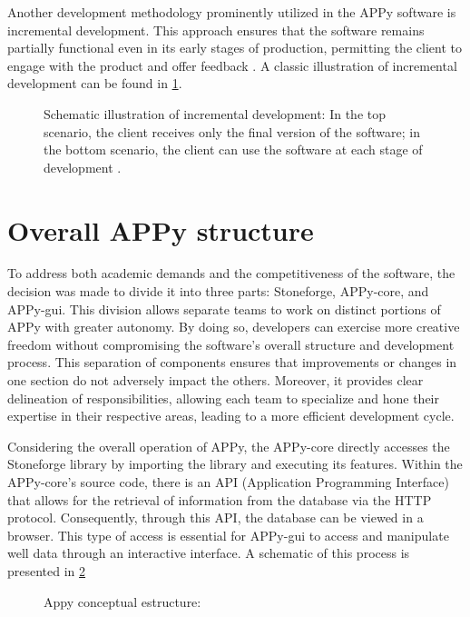 \documentclass[10pt,twocolumn,twoside]{article}
\begin{document}
Another development methodology prominently utilized in the APPy software is incremental development. This approach ensures that the software remains partially functional even in its early stages of production, permitting the client to engage with the product and offer feedback \citep{rolakuchta2015}. A classic illustration of incremental development can be found in \cref{fig:agile_kn}.

\begin{figure}[t]
	\centering
	\caption{Schematic illustration of incremental development: In the top scenario, the client receives only the final version of the software; in the bottom scenario, the client can use the software at each stage of development \citep{knibergagile2015}.}
	\label{fig:agile_kn}
\end{figure}

\section{Overall APPy structure}

To address both academic demands and the competitiveness of the software, the decision was made to divide it into three parts: Stoneforge, APPy-core, and APPy-gui. This division allows separate teams to work on distinct portions of APPy with greater autonomy. By doing so, developers can exercise more creative freedom without compromising the software's overall structure and development process. This separation of components ensures that improvements or changes in one section do not adversely impact the others. Moreover, it provides clear delineation of responsibilities, allowing each team to specialize and hone their expertise in their respective areas, leading to a more efficient development cycle. 

Considering the overall operation of APPy, the APPy-core directly accesses the Stoneforge library by importing the library and executing its features. Within the APPy-core's source code, there is an API (Application Programming Interface) that allows for the retrieval of information from the database via the HTTP protocol. Consequently, through this API, the database can be viewed in a browser. This type of access is essential for APPy-gui to access and manipulate well data through an interactive interface. A schematic of this process is presented in \cref{fig:sub_appy}

\begin{figure}[]
	\centering
	\caption{Appy conceptual estructure: }
	\label{fig:sub_appy}
\end{figure}
\end{document}
